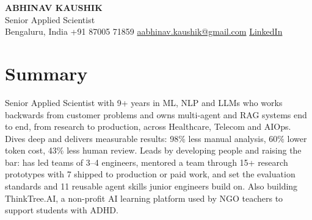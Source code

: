 \documentclass[10pt,a4paper]{article}
\begin{document}
\begin{center}
  {\LARGE\bfseries ABHINAV KAUSHIK}\\[2pt]
  {\large Senior Applied Scientist}\\[2pt]
  Bengaluru, India \textbar{} +91 87005 71859 \textbar{} \href{mailto:aabhinav.kaushik@gmail.com}{aabhinav.kaushik@gmail.com} \textbar{} \href{https://www.linkedin.com/in/abhinav-kaushik10/}{LinkedIn}  
\end{center}

\section{Summary}
Senior Applied Scientist with 9+ years in ML, NLP and LLMs who works backwards from customer problems and owns multi-agent and RAG systems end to end, from research to production, across Healthcare, Telecom and AIOps. Dives deep and delivers measurable results: 98\% less manual analysis, 60\% lower token cost, 43\% less human review. Leads by developing people and raising the bar: has led teams of 3--4 engineers, mentored a team through 15+ research prototypes with 7 shipped to production or paid work, and set the evaluation standards and 11 reusable agent skills junior engineers build on. Also building ThinkTree.AI, a non-profit AI learning platform used by NGO teachers to support students with ADHD.
\end{document}
